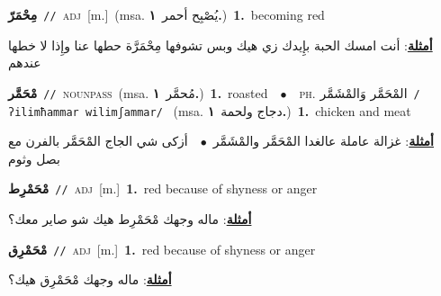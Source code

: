 \documentclass[10pt,a4paper,twoside]{article} %
\begin{document}
\begin{multicols}{2}
{\setlength\topsep{0pt}\textbf{\foreignlanguage{arabic}{مِحْمَرّ}}\ {\color{gray}\texttt{//}\color{black}}\ \textsc{adj}\ [m.]\ \color{gray}(msa. \foreignlanguage{arabic}{يُصْبِح أحمر}~\foreignlanguage{arabic}{\textbf{١.}})\color{black}\ \textbf{1.}~becoming red\  \begin{flushright}\color{gray}\foreignlanguage{arabic}{\textbf{\underline{\foreignlanguage{arabic}{أمثلة}}}: أنت امسك الحبة بإِيدك زي هيك وبس تشوفها مِحْمَرَّة حطها عنا وإِذا لا خطها عندهم}\end{flushright}\color{black}} \vspace{2mm}

{\setlength\topsep{0pt}\textbf{\foreignlanguage{arabic}{مْحَمَّر}}\ {\color{gray}\texttt{//}\color{black}}\ \textsc{noun\textunderscore pass}\ \color{gray}(msa. \foreignlanguage{arabic}{مُحمَّر}~\foreignlanguage{arabic}{\textbf{١.}})\color{black}\ \textbf{1.}~roasted\ \ $\bullet$\ \ \textsc{ph.} \color{gray} \foreignlanguage{arabic}{المْحَمَّر وَالمْشَمَّر}\color{black}\ {\color{gray}\texttt{/{\sffamily ʔilimħammar wilimʃammar}/}\color{black}}\ \color{gray} (msa. \foreignlanguage{arabic}{دجاج ولحمة}~\foreignlanguage{arabic}{\textbf{١.}})\color{black}\ \textbf{1.}~chicken and meat\  \begin{flushright}\color{gray}\foreignlanguage{arabic}{\textbf{\underline{\foreignlanguage{arabic}{أمثلة}}}: غزالة عاملة عالغدا المْحَمَّر والمْشَمَّر\ $\bullet$\ \  أزكى شي الجاج المْحَمَّر بالفرن مع بصل وثوم}\end{flushright}\color{black}} \vspace{2mm}

{\setlength\topsep{0pt}\textbf{\foreignlanguage{arabic}{مْحَمْرِط}}\ {\color{gray}\texttt{//}\color{black}}\ \textsc{adj}\ [m.]\ \textbf{1.}~red because of shyness or anger\  \begin{flushright}\color{gray}\foreignlanguage{arabic}{\textbf{\underline{\foreignlanguage{arabic}{أمثلة}}}: ماله وجهك مْحَمْرِط هيك شو صاير معك؟}\end{flushright}\color{black}} \vspace{2mm}

{\setlength\topsep{0pt}\textbf{\foreignlanguage{arabic}{مْحَمْرِق}}\ {\color{gray}\texttt{//}\color{black}}\ \textsc{adj}\ [m.]\ \textbf{1.}~red because of shyness or anger\  \begin{flushright}\color{gray}\foreignlanguage{arabic}{\textbf{\underline{\foreignlanguage{arabic}{أمثلة}}}: ماله وجهك مْحَمْرِق هيك؟}\end{flushright}\color{black}} \vspace{2mm}


\end{multicols}
\end{document}
